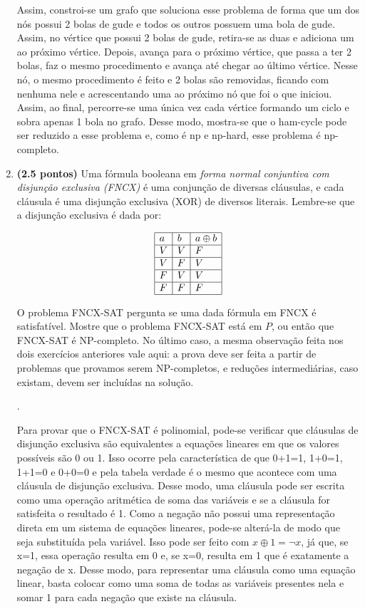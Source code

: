 \documentclass[12pt]{article}
\newcommand{\resposta}[1]{ \noindent {\bf Solução}.{\color{blue} #1}}
\begin{document}
\begin{enumerate}
{	Assim, constroi-se um grafo que soluciona esse problema de forma que um dos nós possui 2 bolas de gude e todos os outros possuem uma bola de gude. Assim, no vértice que possui 2 bolas de gude, retira-se as duas e adiciona um ao próximo vértice. Depois, avança para o próximo vértice, que passa a ter 2 bolas, faz o mesmo procedimento e avança até chegar ao último vértice. Nesse nó, o mesmo procedimento é feito e 2 bolas são removidas, ficando com nenhuma nele e acrescentando uma ao próximo nó que foi o que iniciou. Assim, ao final, percorre-se uma única vez cada vértice formando um ciclo e sobra apenas 1 bola no grafo. Desse modo, mostra-se que o ham-cycle pode ser reduzido a esse problema e, como é np e np-hard, esse problema é np-completo.
	
  }
  
\item {\bf (2.5 pontos)} Uma fórmula booleana em {\it forma normal conjuntiva com disjunção exclusiva (FNCX)} é uma conjunção de diversas cláusulas, e cada cláusula é uma disjunção exclusiva (XOR) de diversos literais. Lembre-se que a disjunção exclusiva é dada por:

  $$\begin{array}{|l|l|l|}\hline
      a & b & a \oplus b \\ \hline
      V & V & F \\ \hline
      V & F & V \\ \hline
      F & V & V \\ \hline
      F & F & F \\ \hline
  \end{array}$$

  O problema FNCX-SAT pergunta se uma dada fórmula em FNCX é
  satisfatível. Mostre que o problema FNCX-SAT está em $P$, ou então
  que FNCX-SAT é NP-completo. No último caso, a mesma observação feita
  nos dois exercícios anteriores vale aqui: a prova deve ser feita a
  partir de problemas que provamos serem NP-completos, e reduções
  intermediárias, caso existam, devem ser incluídas na solução.

  \resposta{
    Para provar que o FNCX-SAT é polinomial, pode-se verificar que cláusulas de disjunção exclusiva são equivalentes a equações lineares em que os valores possíveis são 0 ou 1. Isso ocorre pela característica de que 0+1=1, 1+0=1, 1+1=0 e 0+0=0 e pela tabela verdade é o mesmo que acontece com uma cláusula de disjunção exclusiva. Desse modo, uma cláusula pode ser escrita como uma operação aritmética de soma das variáveis e se a cláusula for satisfeita o resultado é 1. Como a negação não possui uma representação direta em um sistema de equações lineares, pode-se alterá-la de modo que seja substituída pela variável. Isso pode ser feito com ${ x \oplus 1 = \neg x}$, já que, se x=1, essa operação resulta em 0 e, se x=0, resulta em 1 que é exatamente a negação de x. Desse modo, para representar uma cláusula como uma equação linear, basta colocar como uma soma de todas as variáveis presentes nela e somar 1 para cada negação que existe na cláusula.

}
\end{enumerate}
\end{document}
